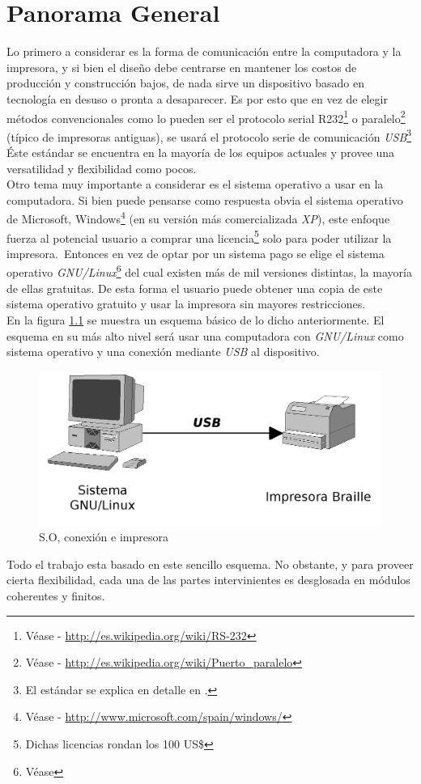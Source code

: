 \chapter{Panorama General}

Lo primero a considerar es la forma de comunicaci\'on entre la computadora y
la impresora, y si bien el dise\~no debe centrarse en mantener los costos de
producci\'on y construcci\'on bajos, de nada sirve un dispositivo basado en
tecnolog\'ia en desuso o pronta a desaparecer. Es por esto que en vez de
elegir m\'etodos convencionales como lo pueden ser el protocolo serial
R232\footnote{V\'ease - \url{http://es.wikipedia.org/wiki/RS-232}} o
paralelo\footnote{V\'ease - \url{http://es.wikipedia.org/wiki/Puerto_paralelo}}
(t\'ipico de impresoras antiguas), se usar\'a el protocolo serie de
comunicaci\'on \emph{USB}\footnote{El est\'andar se explica en detalle en
.} \'Este est\'andar se encuentra en la mayor\'ia de los
equipos actuales y provee una versatilidad y flexibilidad como pocos.\\

Otro tema muy importante a considerar es el sistema operativo a usar en la
computadora. Si bien puede pensarse como respuesta obvia el sistema operativo
de Microsoft,
Windows\footnote{V\'ease - \url{http://www.microsoft.com/spain/windows/}} (en
su versi\'on m\'as comercializada \emph{XP}), este enfoque fuerza al potencial
usuario a comprar una licencia\footnote{Dichas licencias rondan los 100 US\$}
solo para poder utilizar la impresora.\
Entonces en vez de optar por un sistema pago se elige el sistema
operativo \emph{GNU/Linux}\footnote{V\'ease }
del cual existen m\'as de mil versiones distintas, la mayor\'ia de ellas
gratuitas.
De esta forma el usuario puede obtener una copia de este sistema operativo
gratuito y usar la impresora sin mayores restricciones.\\

En la figura \ref{fig:pc_usb_printer} se muestra un esquema b\'asico de lo
dicho anteriormente. El esquema en su m\'as alto nivel ser\'a usar una
computadora con \emph{GNU/Linux} como sistema operativo y una conexi\'on
mediante \emph{USB} al dispositivo.\\

\begin{figure}[htp]
\centering
\includegraphics[width=13cm]{./img/pc_usb_printer.png}
\caption{S.O, conexi\'on e impresora}
\label{fig:pc_usb_printer}
\end{figure}

Todo el trabajo esta basado en este sencillo esquema. No obstante, y para
proveer cierta flexibilidad, cada una de las partes intervinientes es
desglosada en m\'odulos coherentes y finitos.